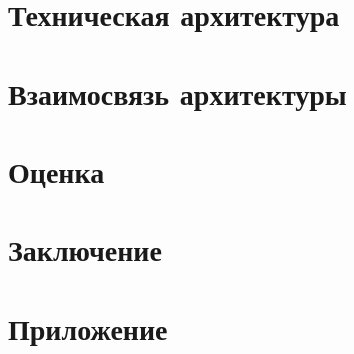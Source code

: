 \documentclass[a4paper, 12pt]{article}
\begin{document}
    \section{Техническая архитектура}
    
\newpage

    \section{Взаимосвязь архитектуры}
    
\newpage

    \section{Оценка}
    
\newpage

    \section{Заключение}
    
\newpage

    \section{Приложение}
    
\end{document}
